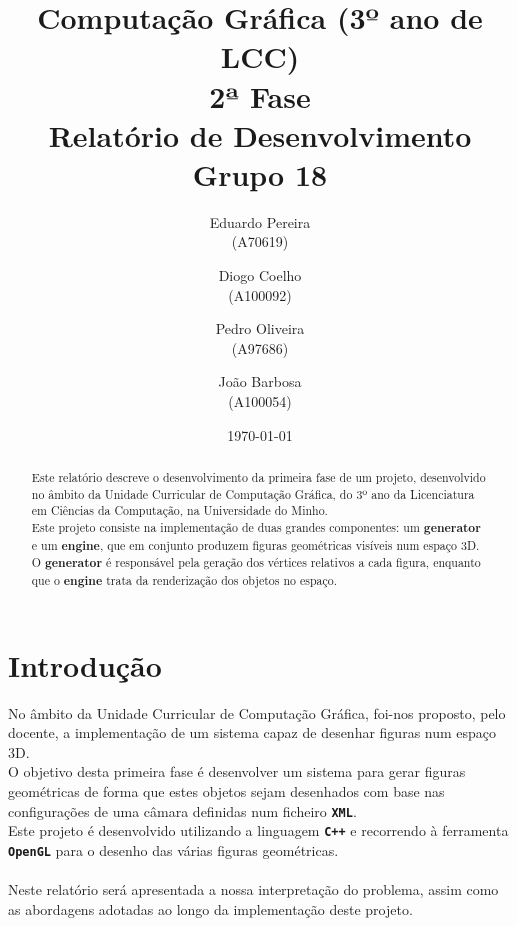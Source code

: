 \documentclass[12pt,a4paper]{report}%
\title{Computação Gráfica (3º ano de LCC)\\
       \textbf{2ª Fase} \\ Relatório de Desenvolvimento\\
       \textbf{ Grupo 18 }
       } %
\author{Eduardo Pereira\\ (A70619) \and Diogo Coelho \\ (A100092)
         \and Pedro Oliveira\\ (A97686) \and João Barbosa\\ (A100054)
       } %
\date{\today} %
\begin{document}
\maketitle %

\begin{abstract}  %

Este relatório descreve o desenvolvimento da primeira fase de um projeto, desenvolvido no âmbito da Unidade Curricular de Computação Gráfica, do 3º ano da Licenciatura em Ciências da Computação, na Universidade do Minho.\newline 
\\ Este projeto consiste na implementação de duas grandes componentes: um \textbf{generator} e um \textbf{engine}, que em conjunto produzem figuras geométricas visíveis num espaço 3D.\\ \newline
O \textbf{generator} é responsável pela geração dos vértices relativos a cada figura, enquanto que o \textbf{engine} trata da renderização dos objetos no espaço. \\
\end{abstract}

\tableofcontents %
\listoffigures %

\chapter{Introdução} \label{chap:intro} %

No âmbito da Unidade Curricular de Computação Gráfica, foi-nos proposto, pelo docente, a implementação de um sistema capaz de desenhar figuras num espaço 3D. \newline
\\ O objetivo desta primeira fase é desenvolver um sistema para gerar figuras geométricas de forma que estes objetos sejam desenhados com base nas configurações de uma câmara definidas num ficheiro  \textbf{\texttt{XML}}.\\
Este projeto é desenvolvido utilizando a linguagem \textbf{\texttt{C++}} e recorrendo à ferramenta \textbf{\texttt{OpenGL}} para o desenho das várias figuras geométricas. \\
\\ Neste relatório será apresentada a nossa interpretação do problema, assim como as abordagens adotadas ao longo da implementação deste projeto.
\\ 
\end{document}
